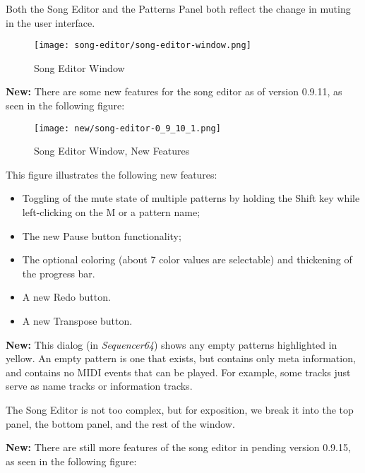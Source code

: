    Both the Song Editor and the Patterns Panel both reflect the change in
   muting in the user interface.

\begin{figure}[H]
   \centering 
   \texttt{[image: song-editor/song-editor-window.png]}
   \caption{Song Editor Window}
   \label{fig:song_editor_window}
\end{figure}

   \textbf{New:}
   There are some new features for the song editor as of version 0.9.11, as
   seen in the following figure:

\begin{figure}[H]
   \centering 
   \texttt{[image: new/song-editor-0\_9\_10\_1.png]}
   \caption{Song Editor Window, New Features}
   \label{fig:song_editor_window_new_features}
\end{figure}

   This figure illustrates the following new features:

   \begin{itemize}
      \item Toggling of the mute state of multiple patterns by holding the
         Shift key while left-clicking on the M or a pattern name;
      \item The new Pause button functionality;
      \item The optional coloring (about 7 color values are selectable)
      and thickening of the progress bar.
      \item A new Redo button.
      \item A new Transpose button.
   \end{itemize}

   \textbf{New:} 
   This dialog (in \textsl{Sequencer64}) shows any empty patterns
   highlighted in yellow.  An empty pattern is one that exists, but
   contains only meta information, and contains no MIDI events that
   can be played.  For example, some tracks just serve as name tracks or
   information tracks.
   
   The Song Editor is not too complex, but for exposition, we break it into
   the top panel, the bottom panel, and the rest of the window.

   \textbf{New:}
   There are still more features of the song editor in
   pending version 0.9.15, as seen in the following
   figure:

